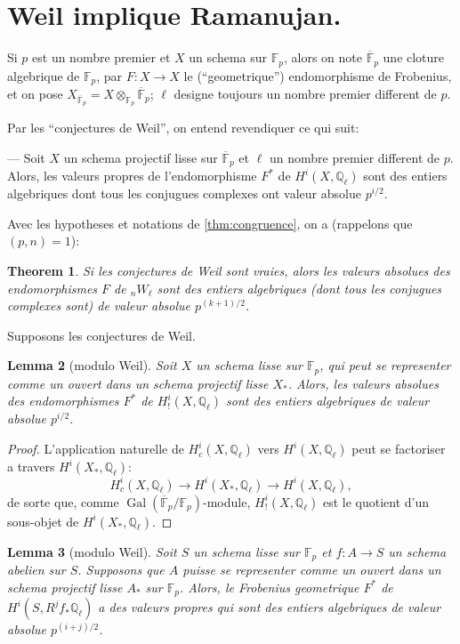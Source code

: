 \documentclass[11pt,reqno]{amsart}
\theoremstyle{plain}
\newtheorem{theorem}{Theorem}[section]
\newtheorem{lemma}[theorem]{Lemma}
\theoremstyle{remark}
\DeclareMathOperator{\Gal}{Gal}
\newcommand{\Q}{\mathbb{Q}}
\newcommand{\F}{\mathbb{F}}
\numberwithin{equation}{section}
\begin{document}
\section{Weil implique Ramanujan.}\label{sec:5}

Si $p$ est un nombre premier et $X$ un schema sur $\F_p$, alors on note $\overline{\F}_p$ une cloture algebrique de $\F_p$, par $F: X \to X$ le (``geometrique'') endomorphisme de Frobenius, et on pose $X_{\overline{\F}_p} = X \otimes_{\F_p} \overline{\F}_p$; $\ell$ designe toujours un nombre premier different de $p$.

Par les ``conjectures de Weil'', on entend revendiquer ce qui suit:

--- Soit $X$ un schema projectif lisse sur $\overline{\F}_p$ et $\ell$ un nombre premier different de $p$. Alors, les valeurs propres de l'endomorphisme $F^*$ de $H^i(X, \Q_\ell)$ sont des entiers algebriques dont tous les conjugues complexes ont valeur absolue $p^{i/2}$.

Avec les hypotheses et notations de \ref{thm:congruence}, on a (rappelons que $(p,n) = 1$):

\begin{theorem}\label{thm:5.1}
Si les conjectures de Weil sont vraies, alors les valeurs absolues des endomorphismes $F$ de ${}_nW_\ell$ sont des entiers algebriques (dont tous les conjugues complexes sont) de valeur absolue $p^{(k+1)/2}$.
\end{theorem}

Supposons les conjectures de Weil.

\begin{lemma}[modulo Weil]\label{lem:5.2}
Soit $X$ un schema lisse sur $\F_p$, qui peut se representer comme un ouvert dans un schema projectif lisse $X_*$. Alors, les valeurs absolues des endomorphismes $F^*$ de $H^i_!(X, \Q_\ell)$ sont des entiers algebriques de valeur absolue $p^{i/2}$.
\end{lemma}

\begin{proof}
L'application naturelle de $H^i_c(X, \Q_\ell)$ vers $H^i(X, \Q_\ell)$ peut se factoriser a travers $H^i(X_*, \Q_\ell)$:
\[
H^i_c(X, \Q_\ell) \to H^i(X_*, \Q_\ell) \to H^i(X, \Q_\ell),
\]
de sorte que, comme $\Gal(\overline{\F}_p/\F_p)$-module, $H^i_!(X, \Q_\ell)$ est le quotient d'un sous-objet de $H^i(X_*, \Q_\ell)$.
\end{proof}

\begin{lemma}[modulo Weil]\label{lem:5.3}
Soit $S$ un schema lisse sur $\F_p$ et $f: A \to S$ un schema abelien sur $S$. Supposons que $A$ puisse se representer comme un ouvert dans un schema projectif lisse $A_*$ sur $\F_p$. Alors, le Frobenius geometrique $F^*$ de $H^i(S, R^jf_*\Q_\ell)$ a des valeurs propres qui sont des entiers algebriques de valeur absolue $p^{(i+j)/2}$.
\end{lemma}
\end{document}
